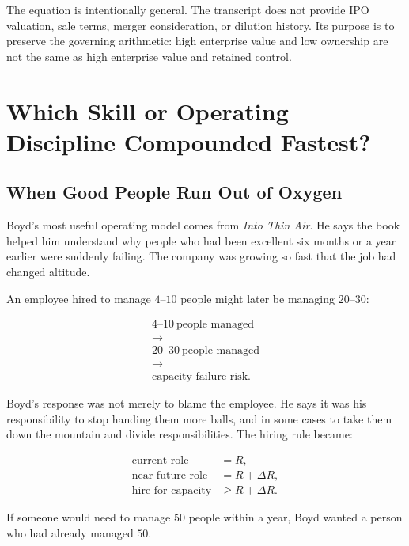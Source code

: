 \documentclass[11pt,oneside]{book}
\begin{document}
The equation is intentionally general. The transcript does not provide IPO valuation, sale terms, merger consideration, or dilution history. Its purpose is to preserve the governing arithmetic: high enterprise value and low ownership are not the same as high enterprise value and retained control.

\chapter{Which Skill or Operating Discipline Compounded Fastest?}

\section{When Good People Run Out of Oxygen}

Boyd's most useful operating model comes from \emph{Into Thin Air}. He says the book helped him understand why people who had been excellent six months or a year earlier were suddenly failing. The company was growing so fast that the job had changed altitude.

An employee hired to manage \(4\text{--}10\) people might later be managing \(20\text{--}30\):

\begin{equation}
\begin{gathered}
4\text{--}10\ \text{people managed}\\
\longrightarrow\\
20\text{--}30\ \text{people managed}\\
\longrightarrow\\
\text{capacity failure risk}.
\end{gathered}
\end{equation}

Boyd's response was not merely to blame the employee. He says it was his responsibility to stop handing them more balls, and in some cases to take them down the mountain and divide responsibilities. The hiring rule became:

\begin{align}
\text{current role} &= R,\\
\text{near-future role} &= R+\Delta R,\\
\text{hire for capacity} &\geq R+\Delta R.
\end{align}

If someone would need to manage \(50\) people within a year, Boyd wanted a person who had already managed \(50\).
\end{document}
